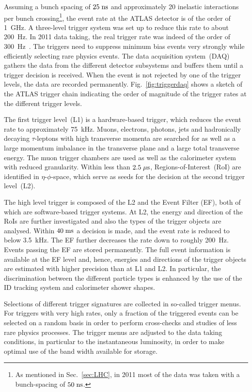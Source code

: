 Assuming a bunch spacing of \mbox{$25 \; \mathrm{ns}$} and approximately 20 inelastic interactions per bunch crossing\footnote{As mentioned in Sec.~\ref{sec:LHC}, in 2011 most of the data was taken with a bunch-spacing of \mbox{$50 \; \mathrm{ns}$}.}, the event rate at the ATLAS detector is
of the order of 1~GHz.
A three-level trigger system was set up to reduce this rate to about 200~Hz.
In 2011 data taking, the real trigger rate was indeed of the order of 300~Hz~\cite{fournier}.
The triggers need to suppress minimum bias events very strongly while efficiently selecting rare physics events.
The data acquisition system~(DAQ) gathers the data from the different detector subsystems and buffers them until a trigger decision is received.
When the event is not rejected by one of the trigger levels, the data are recorded permanently.
Fig.~\ref{fig:triggerdaq} shows a sketch of the ATLAS trigger chain indicating the order of magnitude of the trigger rates at the different trigger
levels.

The first trigger level~(L1) is a hardware-based trigger, which reduces the event rate to approximately 75~kHz.
Muons, electrons, photons, jets and hadronically decaying $\tau$-leptons with high transverse momenta are searched for as well as a large momentum
imbalance in the transverse plane and a large total transverse energy.
The muon trigger chambers are used as well as the calorimeter system with reduced granularity.
Within less than \mbox{$2.5 \; \mu\mathrm{s}$}, Regions-of-Interest~(RoI) are identified in $\eta$-$\phi$-space, which serve as seeds for the decision at the second
trigger level~(L2).

The high level trigger is composed of the L2 and the Event Filter (EF), both of which are software-based trigger systems.
At L2, the energy and direction of the RoIs are further investigated and also the types of the trigger objects are analysed.
Within \mbox{$40 \; \mathrm{ms}$} a decision is made, and the event rate is reduced to below 3.5~kHz.
The EF further decreases the rate down to roughly 200~Hz.
Events passing the EF are stored permanently.
The full event information is available at the EF level and, hence, energies and directions of the trigger objects are estimated with higher precision
than at L1 and L2.
In particular, the discrimination between the different particle types is enhanced by the use of the ID tracking system and calorimeter
shower shapes.

Selections of different trigger signatures are collected in so-called trigger menus.
For triggers with very high rates, only a fraction of the triggered events can be selected on a random basis
in order to perform cross-checks and studies of less rare physics processes.
The trigger menus are adjusted to the data taking conditions, in particular to the instantaneous luminosity, in order to make optimal use of the
band width available for storage.


